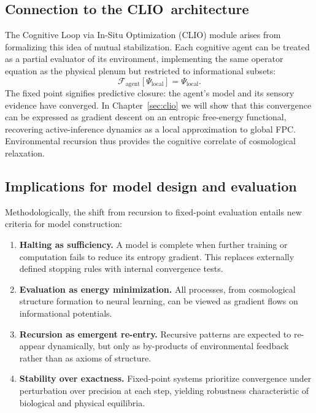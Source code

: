 \documentclass[12pt,a4paper]{article}
\newcommand{\CLIO}{CLIO}              %
\newcommand{\State}{\Psi}             %
\newcommand{\F}{\mathcal{F}}          %
\theoremstyle{plain}
\begin{document}
\subsection{Connection to the \CLIO\ architecture}
The Cognitive Loop via In-Situ Optimization (\CLIO) module arises from formalizing this idea of mutual stabilization.
Each cognitive agent can be treated as a partial evaluator of its environment, implementing the same operator equation as the physical plenum but restricted to informational subsets:
\begin{equation}
\F_{\text{agent}}[\State_{\text{local}}] = \State_{\text{local}}.
\end{equation}
The fixed point signifies predictive closure: the agent’s model and its sensory evidence have converged.
In Chapter~\ref{sec:clio} we will show that this convergence can be expressed as gradient descent on an entropic free-energy functional, recovering active-inference dynamics \citep{friston2023active,friston2025beautiful} as a local approximation to global FPC.
Environmental recursion thus provides the cognitive correlate of cosmological relaxation.

\subsection{Implications for model design and evaluation}
Methodologically, the shift from recursion to fixed-point evaluation entails new criteria for model construction:

\begin{enumerate}[label=\textbf{(\alph*)},leftmargin=*]
\item \textbf{Halting as sufficiency.}
A model is complete when further training or computation fails to reduce its entropy gradient.
This replaces externally defined stopping rules with internal convergence tests.
\item \textbf{Evaluation as energy minimization.}
All processes, from cosmological structure formation to neural learning, can be viewed as gradient flows on informational potentials.
\item \textbf{Recursion as emergent re-entry.}
Recursive patterns are expected to re-appear dynamically, but only as by-products of environmental feedback rather than as axioms of structure.
\item \textbf{Stability over exactness.}
Fixed-point systems prioritize convergence under perturbation over precision at each step, yielding robustness characteristic of biological and physical equilibria.
\end{enumerate}
\end{document}
